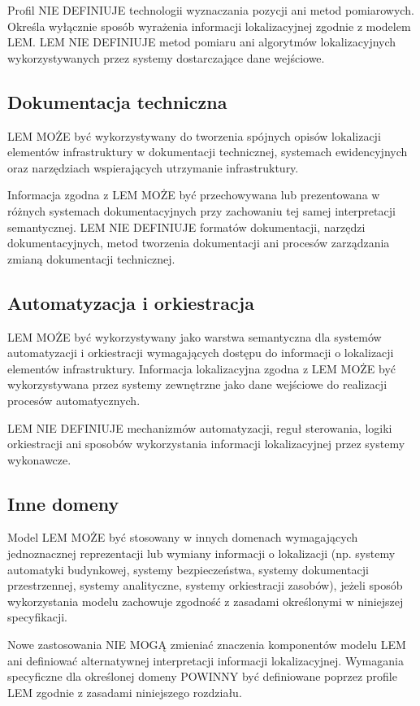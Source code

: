 Profil NIE DEFINIUJE technologii wyznaczania pozycji ani metod pomiarowych. Określa wyłącznie sposób wyrażenia informacji lokalizacyjnej zgodnie z modelem LEM. LEM NIE DEFINIUJE metod pomiaru ani algorytmów lokalizacyjnych wykorzystywanych przez systemy dostarczające dane wejściowe.

\subsection{Dokumentacja techniczna}
LEM MOŻE być wykorzystywany do tworzenia spójnych opisów lokalizacji elementów infrastruktury w dokumentacji technicznej, systemach ewidencyjnych oraz narzędziach wspierających utrzymanie infrastruktury.

Informacja zgodna z LEM MOŻE być przechowywana lub prezentowana w różnych systemach dokumentacyjnych przy zachowaniu tej samej interpretacji semantycznej. LEM NIE DEFINIUJE formatów dokumentacji, narzędzi dokumentacyjnych, metod tworzenia dokumentacji ani procesów zarządzania zmianą dokumentacji technicznej.

\subsection{Automatyzacja i orkiestracja}
LEM MOŻE być wykorzystywany jako warstwa semantyczna dla systemów automatyzacji i orkiestracji wymagających dostępu do informacji o lokalizacji elementów infrastruktury. Informacja lokalizacyjna zgodna z LEM MOŻE być wykorzystywana przez systemy zewnętrzne jako dane wejściowe do realizacji procesów automatycznych.

LEM NIE DEFINIUJE mechanizmów automatyzacji, reguł sterowania, logiki orkiestracji ani sposobów wykorzystania informacji lokalizacyjnej przez systemy wykonawcze.

\subsection{Inne domeny}
Model LEM MOŻE być stosowany w innych domenach wymagających jednoznacznej reprezentacji lub wymiany informacji o lokalizacji (np. systemy automatyki budynkowej, systemy bezpieczeństwa, systemy dokumentacji przestrzennej, systemy analityczne, systemy orkiestracji zasobów), jeżeli sposób wykorzystania modelu zachowuje zgodność z zasadami określonymi w niniejszej specyfikacji.

Nowe zastosowania NIE MOGĄ zmieniać znaczenia komponentów modelu LEM ani definiować alternatywnej interpretacji informacji lokalizacyjnej. Wymagania specyficzne dla określonej domeny POWINNY być definiowane poprzez profile LEM zgodnie z zasadami niniejszego rozdziału.

